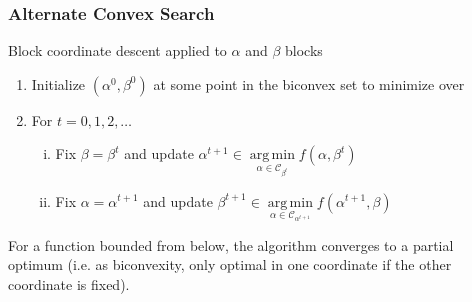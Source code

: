 \documentclass[handout]{beamer}
\DeclareMathOperator*{\argmin}{arg\,min}
\begin{document}
\begin{frame}
\frametitle{Alternate Convex Search}

Block coordinate descent applied to $\alpha$ and $\beta$ blocks
\begin{enumerate}
\item Initialize $(\alpha^0,\beta^0)$ at some point in the biconvex set to minimize over
\item For $t=0,1,2,\dots$
	\begin{enumerate}[(i)]
	\item Fix $\beta=\beta^t$ and update $\alpha^{t+1}\in\argmin\limits_{\alpha\in\mathcal{C}_{\beta^t}}f(\alpha,\beta^t)$
	\item Fix $\alpha=\alpha^{t+1}$ and update $\beta^{t+1}\in\argmin\limits_{\alpha\in\mathcal{C}_{\alpha^{t+1}}}f(\alpha^{t+1},\beta)$
	\end{enumerate}
\end{enumerate}
\vspace{10pt}

For a function bounded from below, the algorithm converges to a partial optimum (i.e. as biconvexity, only optimal in one coordinate if the other coordinate is fixed).
\end{frame}

\end{document}
